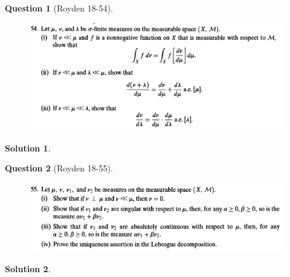 \documentclass{article} %
\theoremstyle{quest}
\newtheorem*{question}{Question}
\newtheorem*{solution}{Solution}
\begin{document}
\begin{question}[Royden 18-54]
\hfill
\begin{figure}[h!]
  \centering
    \includegraphics[width=1\textwidth]{rv-18-54.png}
\end{figure}
\end{question}
\begin{solution}
\end{solution}
\newpage

\begin{question}[Royden 18-55]
\hfill
\begin{figure}[h!]
  \centering
    \includegraphics[width=1\textwidth]{rv-18-55.png}
\end{figure}
\end{question}
\begin{solution}
\end{solution}
\end{document}
